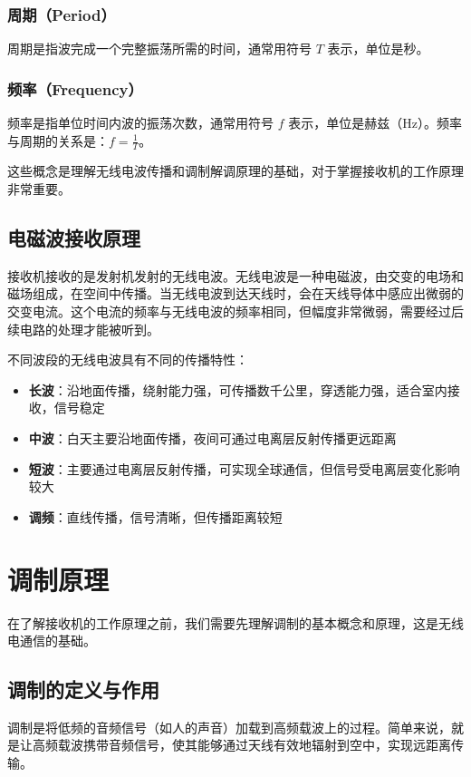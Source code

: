 \documentclass[12pt,UTF8]{ctexbook}
\begin{document}
\subsubsection{周期（Period）}
周期是指波完成一个完整振荡所需的时间，通常用符号 $T$ 表示，单位是秒。

\subsubsection{频率（Frequency）}
频率是指单位时间内波的振荡次数，通常用符号 $f$ 表示，单位是赫兹（Hz）。频率与周期的关系是：$f = \frac{1}{T}$。

这些概念是理解无线电波传播和调制解调原理的基础，对于掌握接收机的工作原理非常重要。

\subsection{电磁波接收原理}

接收机接收的是发射机发射的无线电波。无线电波是一种电磁波，由交变的电场和磁场组成，在空间中传播。当无线电波到达天线时，会在天线导体中感应出微弱的交变电流。这个电流的频率与无线电波的频率相同，但幅度非常微弱，需要经过后续电路的处理才能被听到。

不同波段的无线电波具有不同的传播特性：
\begin{itemize}[leftmargin=3.5em]
    \item \textbf{长波}：沿地面传播，绕射能力强，可传播数千公里，穿透能力强，适合室内接收，信号稳定
    \item \textbf{中波}：白天主要沿地面传播，夜间可通过电离层反射传播更远距离
    \item \textbf{短波}：主要通过电离层反射传播，可实现全球通信，但信号受电离层变化影响较大
    \item \textbf{调频}：直线传播，信号清晰，但传播距离较短
\end{itemize}

\section{调制原理}

在了解接收机的工作原理之前，我们需要先理解调制的基本概念和原理，这是无线电通信的基础。

\subsection{调制的定义与作用}
调制是将低频的音频信号（如人的声音）加载到高频载波上的过程。简单来说，就是让高频载波携带音频信号，使其能够通过天线有效地辐射到空中，实现远距离传输。
\end{document}
